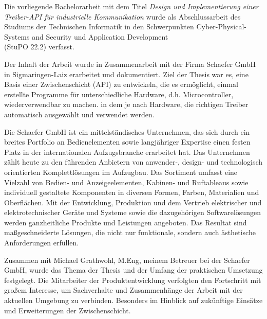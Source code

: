 Die vorliegende Bachelorarbeit mit dem Titel \textit{Design und Implementierung einer Treiber-API für industrielle Kommunikation} wurde als Abschlussarbeit des Studiums der Technischen Informatik in den Schwerpunkten Cyber-Physical-Systems and Security und Application Development\\ (StuPO 22.2) verfasst.

Der Inhalt der Arbeit wurde in Zusammenarbeit mit der Firma Schaefer GmbH in Sigmaringen-Laiz erarbeitet und dokumentiert.
Ziel der Thesis war es, eine Basis einer Zwischenschicht (API) zu entwickeln, die es ermöglicht, einmal erstellte Programme für unterschiedliche Hardware, d.h. Microcontroller, wiederverwendbar zu machen. in dem je nach Hardware, die richtigen Treiber automatisch ausgewählt und verwendet werden.

Die Schaefer GmbH ist ein mittelständisches Unternehmen, das sich durch ein breites Portfolio an Bedienelementen sowie langjähriger Expertise einen festen Platz in der internationalen Aufzugsbranche erarbeitet hat. 
Das Unternehmen zählt heute zu den führenden Anbietern von anwender-, design- und technologisch orientierten Komplettlösungen im Aufzugbau.
Das Sortiment umfasst eine Vielzahl von Bedien- und Anzeigeelementen, Kabinen- und Ruftableaus sowie individuell gestaltete Komponenten in diversen Formen, Farben, Materialien und Oberflächen. 
Mit der Entwicklung, Produktion und dem Vertrieb elektrischer und elektrotechnischer Geräte und Systeme sowie die dazugehörigen Softwarelösungen werden ganzheitliche Produkte und Leistungen angeboten.
Das Resultat sind maßgeschneiderte Lösungen, die nicht nur funktionale, sondern auch ästhetische Anforderungen erfüllen. 

Zusammen mit Michael Grathwohl, M.Eng, meinem Betreuer bei der Schaefer GmbH, wurde das Thema der Thesis und der Umfang der praktischen Umsetzung festgelegt.
Die Mitarbeiter der Produktentwicklung verfolgten den Fortschritt mit großem Interesse, um Sachverhalte und Zusammenhänge der Arbeit mit der aktuellen Umgebung zu verbinden.
Besonders im Hinblick auf zukünftige Einsätze und Erweiterungen der Zwischenschicht.
